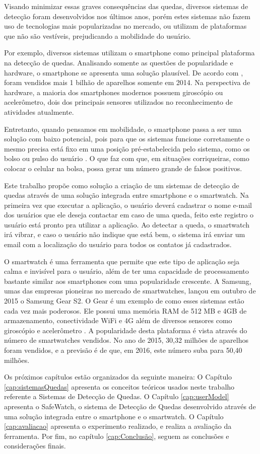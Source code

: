Visando minimizar essas graves consequências das quedas, diversos sistemas de detecção foram desenvolvidos nos últimos anos, porém estes sistemas não fazem uso de tecnologias mais popularizadas no mercado, ou utilizam de plataformas que não são vestíveis, prejudicando a mobilidade do usuário. 

Por exemplo, diversos sistemas utilizam o smartphone como principal plataforma na detecção de quedas. Analisando somente as questões de popularidade e hardware, o smartphone se apresenta uma solução plausível. De acordo com \cite{smartphoneSales:15}, foram vendidos  mais 1 bilhão de aparelhos somente em 2014. Na perspectiva de hardware, a maioria dos smartphones modernos possuem giroscópio ou  acelerômetro, dois dos principais sensores utilizados no reconhecimento de atividades atualmente.
 
Entretanto, quando pensamos em mobilidade, o smartphone passa a ser uma solução com baixo potencial,  pois para que os sistemas funcione corretamente o mesmo precisa está fixo em uma posição pré-estabelecida pelo sistema, como os bolso ou pulso do usuário \cite{FallDectionSmartPhone:12}. O que faz com que, em situações corriqueiras, como colocar o celular na bolsa, possa gerar um número grande de falsos positivos.

Este trabalho propõe como solução a criação de um sistemas de detecção de quedas através de uma solução integrada entre smartphone e o smartwatch. Na primeira vez que executar a aplicação, o usuário deverá cadastrar o nome e-mail dos usuários que ele deseja contactar em caso de uma  queda, feito este registro o usuário está pronto pra utilizar a aplicação. Ao detectar a queda, o smartwatch irá vibrar, e caso o usuário não indique que está bem, o sistema irá enviar um email com a localização do usuário para todos os contatos já cadastrados.   

O smartwatch é uma ferramenta que permite que este tipo de aplicação seja calma e invisível para o usuário, além de ter uma capacidade de processamento bastante similar aos smartphones com uma popularidade crescente. A Samsung, umas das empresas pioneiras no mercado de smartwatches, lançou em outubro de 2015 o Samsung Gear S2. O Gear é um exemplo de como esses sistemas estão cada vez mais poderosos. Ele possui uma memória RAM de 512 MB e 4GB de armazenamento,  conectividade WiFi e 4G além de diversos sensores como giroscópio e acelerômetro \cite{samsungSpecification:16}. A popularidade desta plataforma é vista através do número de smartwatches vendidos. No ano de 2015, 30,32 milhões de aparelhos foram vendidos, e a previsão é de que, em 2016, este número suba para 50,40 milhões. 


Os próximos capítulos estão organizados da seguinte maneira: O Capítulo \ref{cap:sistemasQuedas} apresenta os conceitos teóricos usados neste trabalho referente a Sistemas de Detecção de Quedas. O Capítulo \ref{cap:userModel} apresenta o SafeWatch, o sistema de Detecção de Quedas desenvolvido através de uma solução integrada entre o smartphone e o smartwatch. O Capítulo \ref{cap:avaliacao} apresenta o experimento realizado, e realiza a avaliação da ferramenta. Por fim, no capítulo \ref{cap:Conclusão}, seguem as conclusões e considerações finais. 


